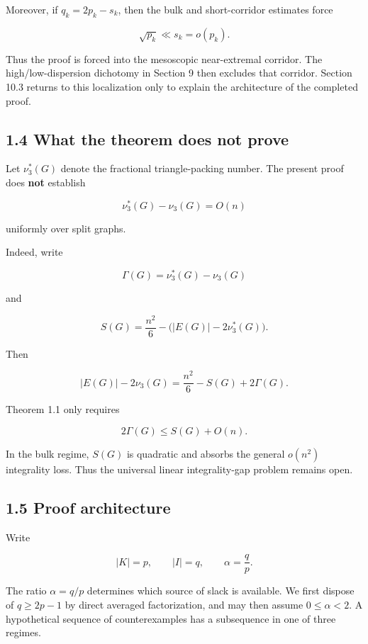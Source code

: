 \documentclass[
  american,
  11pt,
  a4paper,
]{article}
\begin{document}
Moreover, if \(q_k=2p_k-s_k\), then the bulk and short-corridor estimates force

\[
\sqrt{p_k}\ll s_k=o(p_k).
\]

Thus the proof is forced into the mesoscopic near-extremal corridor. The high/low-dispersion dichotomy in Section 9 then excludes that corridor. Section 10.3 returns to this localization only to explain the architecture of the completed proof.

\subsection{1.4 What the theorem does not prove}\label{what-the-theorem-does-not-prove}

Let \(\nu_3^*(G)\) denote the fractional triangle-packing number. The present proof does \textbf{not} establish

\[
\nu_3^*(G)-\nu_3(G)=O(n)
\tag{1.4}
\]

uniformly over split graphs.

Indeed, write

\[
\Gamma(G)=\nu_3^*(G)-\nu_3(G)
\]

and

\[
S(G)=\frac{n^2}{6}-\bigl(|E(G)|-2\nu_3^*(G)\bigr).
\]

Then

\[
|E(G)|-2\nu_3(G)
=
\frac{n^2}{6}-S(G)+2\Gamma(G).
\tag{1.5}
\]

Theorem 1.1 only requires

\[
2\Gamma(G)\le S(G)+O(n).
\]

In the bulk regime, \(S(G)\) is quadratic and absorbs the general \(o(n^2)\) integrality loss. Thus the universal linear integrality-gap problem remains open.

\subsection{1.5 Proof architecture}\label{proof-architecture}

Write

\[
|K|=p,
\qquad
|I|=q,
\qquad
\alpha=\frac qp.
\]

The ratio \(\alpha=q/p\) determines which source of slack is available. We first dispose of \(q\ge2p-1\) by direct averaged factorization, and may then assume \(0\le\alpha<2\). A hypothetical sequence of counterexamples has a subsequence in one of three regimes.
\end{document}
